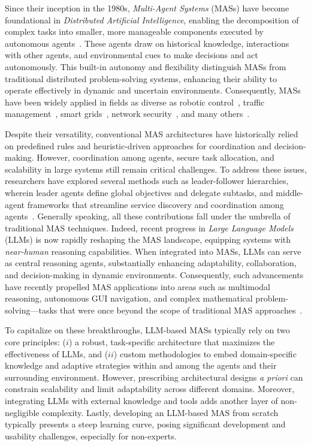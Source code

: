 Since their inception in the 1980s, {\em Multi-Agent Systems} (MASs) have become foundational in {\em Distributed Artificial Intelligence}, enabling the decomposition of complex tasks into smaller, more manageable components executed by autonomous agents~\cite{vlassis2022concise,dorri2018multi}. These agents draw on historical knowledge, interactions with other agents, and environmental cues to make decisions and act autonomously. This built-in autonomy and flexibility distinguish MASs from traditional distributed problem-solving systems, enhancing their ability to operate effectively in dynamic and uncertain environments. Consequently, MASs have been widely applied in fields as diverse as robotic control~\cite{czimmermann2021autonomous,cena2013cooperative,verma2021multi}, traffic management~\cite{balaji2007multi,hamidi2018approach}, smart grids~\cite{shobole2021multiagent,merabet2014applications}, network security~\cite{gorodetski2003multi,herrero2009multiagent,gorodetski2002multi}, and many others~\cite{dorri2018multi}.

Despite their versatility, conventional MAS architectures have historically relied on predefined rules and heuristic-driven approaches for coordination and decision-making. However, coordination among agents, secure task allocation, and scalability in large systems still remain critical challenges. To address these issues, researchers have explored several methods such as leader-follower hierarchies, wherein leader agents define global objectives and delegate subtasks, and middle-agent frameworks that streamline service discovery and coordination among agents~\cite{dorri2018multi}. Generally speaking, all these contributions fall under the umbrella of traditional MAS techniques. Indeed, recent progress in {\em Large Language Models} (LLMs) is now rapidly reshaping the MAS landscape, equipping systems with {\em near-human} reasoning capabilities. When integrated into MASs, LLMs can serve as central reasoning agents, substantially enhancing adaptability, collaboration, and decision-making in dynamic environments. Consequently, such advancements have recently propelled MAS applications into areas such as multimodal reasoning, autonomous GUI navigation, and complex mathematical problem-solving—tasks that were once beyond the scope of traditional MAS approaches~\cite{wang2024survey, zhuge2023mindstorms}.

To capitalize on these breakthroughs, LLM-based MASs typically rely on two core principles: ($i$) a robust, task-specific architecture that maximizes the effectiveness of LLMs, and ($ii$) custom methodologies to embed domain-specific knowledge and adaptive strategies within and among the agents and their surrounding environment. However, prescribing architectural designs {\em a priori} can constrain scalability and limit adaptability across different domains. Moreover, integrating LLMs with external knowledge and tools adds another layer of non-negligible complexity. Lastly, developing an LLM-based MAS from scratch typically presents a steep learning curve, posing significant development and usability challenges, especially for non-experts.

